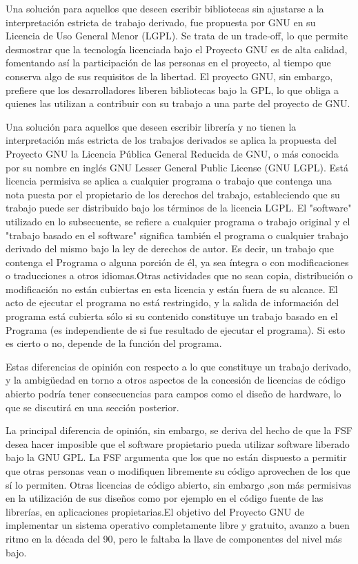 	Una solución para aquellos que deseen escribir bibliotecas sin ajustarse a la interpretación estricta de trabajo derivado, fue
 	propuesta por GNU en su Licencia de Uso General Menor (LGPL). Se trata de un trade-off, lo que permite desmostrar que la tecnología licenciada bajo
 	el Proyecto GNU es de alta calidad, fomentando así la participación de las personas en el proyecto, al tiempo que conserva algo de sus requisitos
 	de la libertad. El proyecto GNU, sin embargo, prefiere que los desarrolladores liberen bibliotecas bajo la GPL, lo que obliga a quienes las
 	utilizan a contribuir con su trabajo a una parte del proyecto de GNU.
	
	Una solución para aquellos que deseen escribir librería y no tienen la interpretación más estricta de los trabajos derivados se aplica la propuesta
 	del Proyecto GNU la Licencia Pública General Reducida de GNU, o más conocida por su nombre en inglés GNU Lesser General Public License (GNU LGPL). Está
 	licencia permisiva se aplica a cualquier programa o trabajo que contenga una nota puesta por el propietario de los derechos del trabajo,
 	estableciendo que su trabajo puede ser distribuido bajo los términos de la licencia LGPL. El "software" utilizado en lo subsecuente, se refiere a cualquier programa o trabajo original y el "trabajo basado en el software" significa también el programa o cualquier trabajo derivado del mismo bajo la ley de derechos de autor. Es decir, un trabajo que contenga el Programa o alguna porción de él, ya sea íntegra o con modificaciones o traducciones a otros idiomas.Otras actividades que no sean copia, distribución o modificación no están cubiertas en esta licencia y están fuera de su alcance. El acto de ejecutar el programa no está restringido, y la salida de información del programa está cubierta sólo si su contenido constituye un trabajo basado en el Programa (es independiente de si fue resultado de ejecutar el programa). Si esto es cierto o no, depende de la función del programa.\cite{Etiqueta03} 

	Estas diferencias de opinión con respecto a lo que constituye un trabajo derivado, y la ambigüedad en torno a otros
	aspectos de la concesión de licencias de código abierto podría tener consecuencias para campos como el diseño de hardware, lo que se discutirá en una
	sección posterior.

	La principal diferencia de opinión, sin embargo, se deriva del hecho de que la FSF desea hacer imposible que el software
	propietario  pueda utilizar software liberado bajo la GNU GPL. La FSF argumenta que los que no están dispuesto a permitir que otras personas vean o
	modifiquen libremente su código aprovechen de los que sí lo permiten. Otras licencias de código abierto, sin embargo ,son más permisivas en la
	utilización de sus diseños como por ejemplo en el código fuente de las librerías, en aplicaciones propietarias.El objetivo del Proyecto GNU de implementar 
	un sistema operativo completamente libre y gratuito, avanzo a buen ritmo en la década del 90, pero le faltaba la llave de componentes del nivel más bajo.

